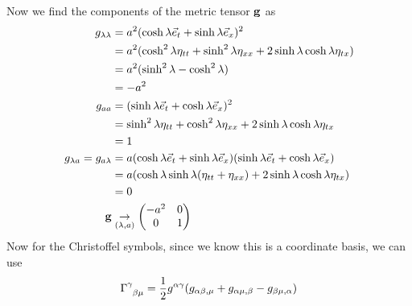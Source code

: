 \documentclass[gr-notes.tex]{subfiles}
\begin{document}
Now we find the components of the metric tensor $\vb{g}$ as
%
\begin{align*}
  g_{\lambda\lambda} &=
  a^2
  ( \cosh\lambda \vec{e}_t +
    \sinh\lambda \vec{e}_x )^2
  \\ &=
  a^2
  ( \cosh^2\lambda \eta_{tt} +
    \sinh^2\lambda \eta_{xx} +
    2 \sinh\lambda \cosh\lambda \eta_{tx} )
  \\ &=
  a^2 (\sinh^2\lambda - \cosh^2\lambda)
  \\ &=
  -a^2
  \\
  g_{aa} &=
  (\sinh\lambda \vec{e}_t + \cosh\lambda \vec{e}_x)^2
  \\ &=
  \sinh^2\lambda \eta_{tt} +
  \cosh^2\lambda \eta_{xx} +
  2 \sinh\lambda \cosh\lambda \eta_{tx}
  \\ &=
  1
  \\
  g_{\lambda a} = g_{a \lambda} &=
  a (\cosh\lambda \vec{e}_t + \sinh\lambda \vec{e}_x)
    (\sinh\lambda \vec{e}_t + \cosh\lambda \vec{e}_x)
  \\ &=
  a
  ( \cosh\lambda \sinh\lambda (\eta_{tt} + \eta_{xx}) +
    2 \sinh\lambda \cosh\lambda \eta_{tx} )
  \\ &=
  0
  \\
  \vb{g} &\underset{(\lambda,a)}{\to}
  \mqty( -a^2 & 0 \\ 0 & 1 )
\end{align*}
%
Now for the Christoffel symbols, since we know this is a coordinate basis, we can use
%
\begin{displaymath}
  \tensor{\Gamma}{^\gamma_{\beta \mu}} =
  \frac{1}{2} g^{\alpha \gamma}
  (g_{\alpha \beta , \mu} + g_{\alpha \mu , \beta} - g_{\beta \mu , \alpha})
\end{displaymath}
%
\end{document}
